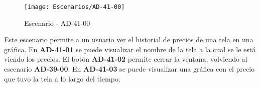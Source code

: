 \begin{figure}[H]
\centering
\texttt{[image: Escenarios/AD-41-00]}
\caption{Escenario - AD-41-00}
\label{fig:AD-41-00}
\end{figure}

Este escenario permite a un usuario ver el historial de precios de una tela en una gráfica. En \textbf{AD-41-01} se puede visualizar el nombre de la tela a la cual se le está viendo los precios. El botón \textbf{AD-41-02} permite cerrar la ventana, volviendo al escenario \textbf{AD-39-00}. En \textbf{AD-41-03} se puede visualizar una gráfica con el precio que tuvo la tela a lo largo del tiempo.
\\